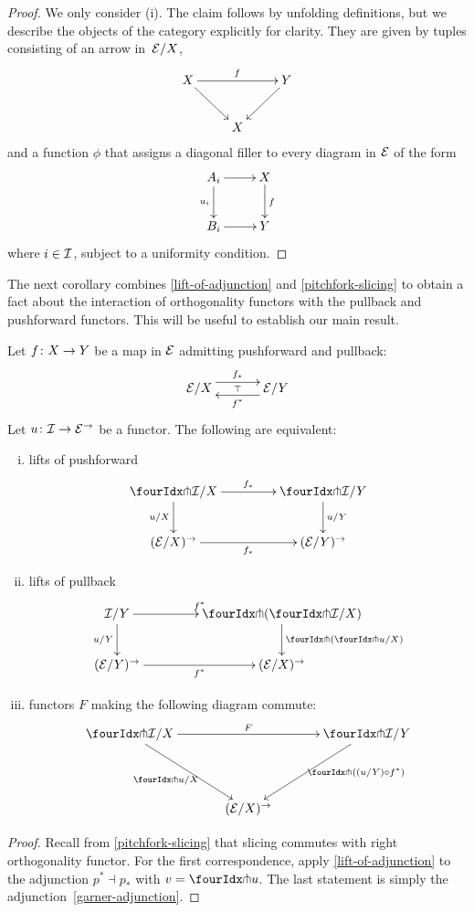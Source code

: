 \documentclass[reqno,10pt,a4paper,oneside]{amsart}
\begin{document}
\begin{proof} We only consider (i). The claim follows by unfolding definitions, but we describe the objects of the category explicitly for clarity. They are given by 
tuples consisting of an arrow in~$\cal{E}/X$, 
\[
\xymatrix{
X \ar[dr] \ar[rr]^f  &  & Y \ar[dl] \\
 & X & }
 \]
and a function $\phi$ that assigns a diagonal filler to every diagram in $\cal{E}$ of the form
\[
\xymatrix{
A_i \ar[r] \ar[d]_{u_i} & X \ar[d]^{f} \\
B_i \ar[r] & Y}
\]
where $i \in \cal{I}$, subject to a uniformity condition. 
\end{proof}

The next corollary combines \cref{lift-of-adjunction} and \cref{pitchfork-slicing} to obtain 
a fact about the interaction of orthogonality functors with the pullback and pushforward
functors. This will be useful to establish our main result.

\begin{corollary}
\label{lift-dependent-product}
Let $f \co X \to Y$ be a map in $\catE$ admitting pushforward and pullback:
\[
\xymatrix@C+1em{
  \catE/X
  \ar@<5pt>[r]^{f_*}
  \ar@{}[r]|{\top}
&
  \catE/Y
  \ar@<5pt>[l]^{f^*}
}
\]
Let $u \co \cal{I} \to \catE^{\to}$ be a functor. The following are
equivalent:
\begin{enumerate}[(i)]
\item lifts of pushforward
\[
\xymatrix@C=1.5cm{
\liftr{\cal{I}}/X
\ar[r]^{f_*}
  \ar[d]_{u/X}
&
  \liftr{\cal{I}}/Y
  \ar[d]^{u/Y}
\\
  (\catE/X)^{\to}
   \ar[r]_{f_*}
&
  (\catE/Y)^{\to}
 }
\]
\item lifts of pullback
\[
\xymatrix@C=1.5cm{
  \cal{I}/Y
   \ar[r]^{f^*}
  \ar[d]_{u/Y} 
  &
  \liftl{ ( \liftr{\cal{I}}/X ) }
  \ar[d]^{\liftl{(\liftr{u}/X)}}
     \\
     (\catE/Y)^{\to} \ar[r]_{f^*} &
   (\catE/X)^{\to} 
}
\]
\item functors $F$ making the following diagram commute:
\[
\xymatrix@C=1.2cm@R=1.5cm{
\liftr{\cal{I}}/X \ar[rr]^F \ar[dr]_{\liftr{u}/X} & &  \liftr{\cal{I}}/ Y \ar[dl]^(.4){\ \liftr{( (u/Y) \cc f^*)}}  \\
 & (\cal{E}/X)^\to & }
\]
\end{enumerate}
\end{corollary}

\begin{proof}
Recall from \cref{pitchfork-slicing} that slicing commutes with right orthogonality functor.
For the first correspondence, apply \cref{lift-of-adjunction} to the adjunction $p^* \dashv p_*$ with  $v = \liftr{u}$.
The last statement is simply the adjunction~\eqref{garner-adjunction}.
\end{proof}
\end{document}
